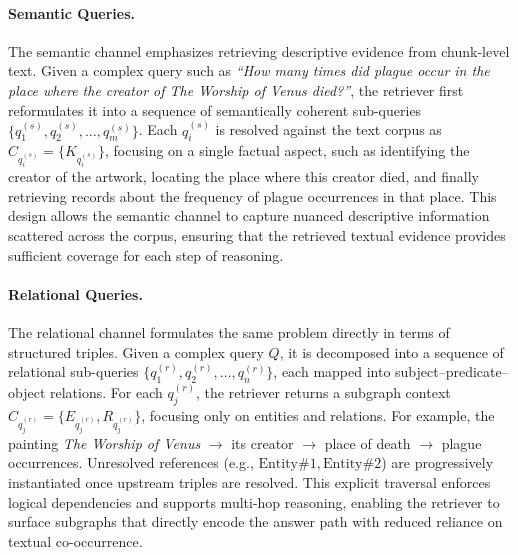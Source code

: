 \paragraph{Semantic Queries.}  
The semantic channel emphasizes retrieving descriptive evidence from chunk-level text. Given a complex query such as \textit{``How many times did plague occur in the place where the creator of \textit{The Worship of Venus} died?''}, the retriever first reformulates it into a sequence of semantically coherent sub-queries $\{q_1^{(s)}, q_2^{(s)}, \dots, q_m^{(s)}\}$. Each $q_i^{(s)}$ is resolved against the text corpus as $C_{q_i^{(s)}} = \{K_{q_i^{(s)}}\}$, focusing on a single factual aspect, such as identifying the creator of the artwork, locating the place where this creator died, and finally retrieving records about the frequency of plague occurrences in that place. This design allows the semantic channel to capture nuanced descriptive information scattered across the corpus, ensuring that the retrieved textual evidence provides sufficient coverage for each step of reasoning.

\paragraph{Relational Queries.}  
The relational channel formulates the same problem directly in terms of structured triples. Given a complex query $Q$, it is decomposed into a sequence of relational sub-queries $\{q_1^{(r)}, q_2^{(r)}, \dots, q_n^{(r)}\}$, each mapped into subject--predicate--object relations. For each $q_j^{(r)}$, the retriever returns a subgraph context $C_{q_j^{(r)}} = \{E_{q_j^{(r)}}, R_{q_j^{(r)}}\}$, focusing only on entities and relations. For example, the painting \textit{The Worship of Venus} $\rightarrow$ its creator $\rightarrow$ place of death $\rightarrow$ plague occurrences. Unresolved references (e.g., $\mathrm{Entity\#1}, \mathrm{Entity\#2}$) are progressively instantiated once upstream triples are resolved. This explicit traversal enforces logical dependencies and supports multi-hop reasoning, enabling the retriever to surface subgraphs that directly encode the answer path with reduced reliance on textual co-occurrence.


